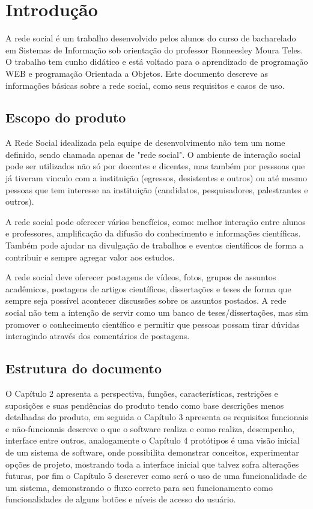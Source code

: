 \chapter{Introdução}

A rede social é um trabalho desenvolvido pelos alunos do curso de bacharelado em Sistemas de Informação sob orientação do professor Ronneesley Moura Teles.
O trabalho tem cunho didático e está voltado para o aprendizado de programação WEB e programação Orientada a Objetos.
Este documento descreve as informações básicas sobre a rede social, como seus requisitos e casos de uso.


\section{Escopo do produto}
A Rede Social idealizada pela equipe de desenvolvimento não tem um nome definido, sendo chamada apenas de "rede social".
O ambiente de interação social pode ser utilizados não só por docentes e dicentes, mas também por pesssoas que já tiveram vinculo com a instituição (egressos, desistentes e outros) ou até mesmo
pessoas que tem interesse na instituição (candidatos, pesquisadores, palestrantes e outros).

A rede social pode oferecer vários benefícios, como: melhor interação entre alunos e professores, amplificação da difusão do conhecimento e informações científicas.
Também pode ajudar na divulgação de trabalhos e eventos científicos de forma a contribuir e sempre agregar valor aos estudos.

A rede social deve oferecer postagens de vídeos, fotos, grupos de assuntos acadêmicos, postagens de artigos científicos, dissertações e teses de forma que sempre seja possível 
acontecer discussões sobre os assuntos postados. A rede social não tem a intenção de servir como um banco de teses/dissertações, mas sim promover o conhecimento científico e permitir
que pessoas possam tirar dúvidas interagindo através dos comentários de postagens. 
  

\section{Estrutura do documento}

O Capítulo 2 apresenta a perspectiva, funções, características, restrições e suposições e suas pendências do produto tendo como base descrições menos detalhadas do produto, em seguida o Capítulo 3 apresenta os requisitos funcionais e não-funcionais descreve o que o software realiza e como realiza, desempenho, interface entre outros, analogamente o Capítulo 4 protótipos é uma visão inicial de um sistema de software, onde possibilita demonstrar conceitos, experimentar opções de projeto, mostrando toda a interface inicial que talvez sofra alterações futuras, por fim o Capítulo 5 descrever como será o uso de uma funcionalidade de um sistema, demonstrando o fluxo correto para seu funcionamento como funcionalidades de alguns botões e níveis de acesso do usuário.